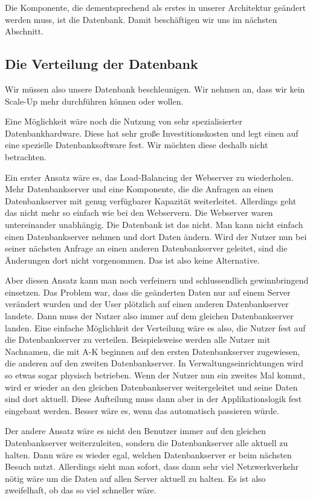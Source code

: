 Die Komponente, die dementsprechend als erstes in unserer Architektur geändert werden muss, ist die Datenbank.
Damit beschäftigen wir uns im nächsten Abschnitt.

\subsection{Die Verteilung der Datenbank}
Wir müssen also unsere Datenbank beschleunigen. Wir nehmen an, dass wir kein Scale-Up mehr durchführen können oder
wollen.

Eine Möglichkeit wäre noch die Nutzung von sehr spezialisierter Datenbankhardware. Diese hat sehr große Investitionskosten
und legt einen auf eine spezielle Datenbanksoftware fest. Wir möchten diese deshalb nicht betrachten.

Ein erster Ansatz wäre es, das Load-Balancing der Webserver zu wiederholen. Mehr Datenbankserver und eine Komponente,
die die Anfragen an einen Datenbankserver mit genug verfügbarer Kapazität weiterleitet. Allerdings geht das
nicht mehr so einfach wie bei den Webservern. Die Webserver waren untereinander unabhängig. Die Datenbank ist
das nicht. Man kann nicht einfach einen Datenbankserver nehmen und dort Daten ändern. Wird der Nutzer nun
bei seiner nächsten Anfrage an einen anderen Datenbankserver geleitet, sind die Änderungen dort nicht vorgenommen.
Das ist also keine Alternative.

Aber diesen Ansatz kann man noch verfeinern und schlussendlich gewinnbringend einsetzen.  Das Problem war,
dass die geänderten Daten nur auf einem Server verändert wurden und der User plötzlich auf einen anderen
Datenbankserver landete. Dann muss der Nutzer also immer auf dem gleichen Datenbankserver landen.
Eine einfache Möglichkeit der Verteilung wäre es also, die Nutzer fest auf die Datenbankserver zu verteilen.
Beispielsweise werden alle Nutzer mit Nachnamen, die mit A-K beginnen auf den ersten Datenbankserver zugewiesen,
die anderen auf den zweiten Datenbankserver. In Verwaltungseinrichtungen wird so etwas sogar physisch betrieben.
Wenn der Nutzer nun ein zweites Mal kommt, wird er wieder an den gleichen Datenbankserver weitergeleitet und
seine Daten sind dort aktuell. Diese Aufteilung muss dann aber in der Applikationslogik fest eingebaut werden.
Besser wäre es, wenn das automatisch passieren würde.

Der andere Ansatz wäre es nicht den Benutzer immer auf den gleichen Datenbankserver weiterzuleiten, sondern
die Datenbankserver alle aktuell zu halten. Dann wäre es wieder egal, welchen Datenbankserver er beim nächsten
Besuch nutzt. Allerdings sieht man sofort, dass dann sehr viel Netzwerkverkehr nötig wäre um die Daten auf allen
Server aktuell zu halten. Es ist also zweifelhaft, ob das so viel schneller wäre.

